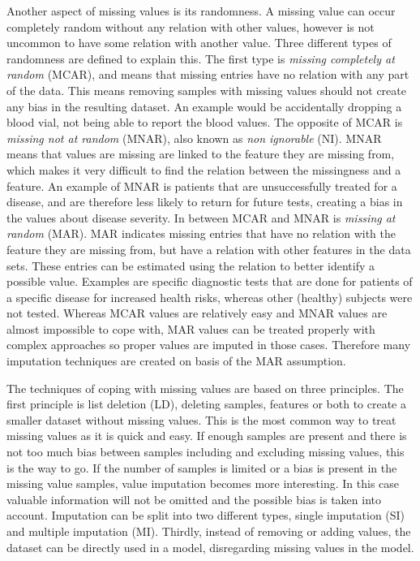\documentclass[10pt,a4paper]{article}
\begin{document}
	Another aspect of missing values is its randomness. A missing value can occur completely random without any relation with other values, however is not uncommon to have some relation with another value. Three different types of randomness are defined to explain this. The first type is \textit{missing completely at random} (MCAR)\cite{donders2006gentle,cartwright2003dealing, haukoos2007advanced}, and means that missing entries have no relation with any part of the data. This means removing samples with missing values should not create any bias in the resulting dataset. An example would be accidentally dropping a blood vial, not being able to report the blood values. The opposite of MCAR is \textit{missing not at random} (MNAR)\cite{donders2006gentle, haukoos2007advanced}, also known as \textit{non ignorable} (NI)\cite{cartwright2003dealing}. MNAR means that values are missing are linked to the feature they are missing from, which makes it very difficult to find the relation between the missingness and a feature. An example of MNAR is patients that are unsuccessfully treated for a disease, and are therefore less likely to return for future tests, creating a bias in the values about disease severity. In between MCAR and MNAR is \textit{missing at random} (MAR)\cite{donders2006gentle,cartwright2003dealing, haukoos2007advanced}. MAR indicates missing entries that have no relation with the feature they are missing from, but have a relation with other features in the data sets. These entries can be estimated using the relation to better identify a possible value. Examples are specific diagnostic tests that are done for patients of a specific disease for increased health risks, whereas other (healthy) subjects were not tested\cite{haukoos2007advanced}. Whereas MCAR values are relatively easy and MNAR values are almost impossible to cope with, MAR values can be treated properly with complex approaches so proper values are imputed in those cases. Therefore many imputation techniques are created on basis of the MAR assumption.
	
	The techniques of coping with missing values are based on three principles. The first principle is list deletion (LD)\cite{donders2006gentle, haukoos2007advanced}, deleting samples, features or both to create a smaller dataset without missing values. This is the most common way to treat missing values as it is quick and easy. If enough samples are present and there is not too much bias between samples including and excluding missing values, this is the way to go. If the number of samples is limited or a bias is present in the missing value samples, value imputation becomes more interesting. In this case valuable information will not be omitted and the possible bias is taken into account. Imputation can be split into two different types, single imputation (SI)\cite{donders2006gentle, cartwright2003dealing, haukoos2007advanced} and multiple imputation (MI)\cite{donders2006gentle, patrician2002multiple, sterne2009multiple}. Thirdly, instead of removing or adding values, the dataset can be directly used in a model, disregarding missing values in the model\cite{myrtveit2001analyzing}.
	
\end{document}
